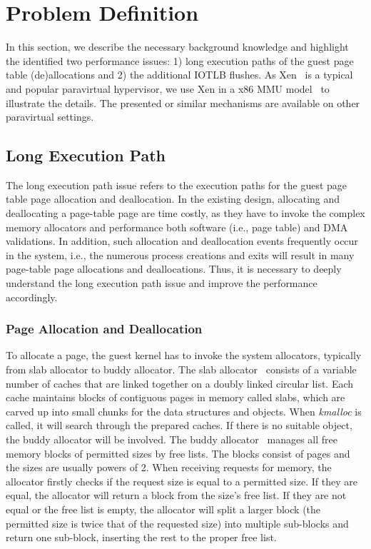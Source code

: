 \section{Problem Definition} \label{sec:prob}
In this section, we describe the necessary background knowledge and highlight the identified two performance issues: 1) long execution paths of the guest page table (de)allocations and 2) the additional IOTLB flushes.
As Xen~\cite{XEN-SOSP03} is a typical and popular paravirtual hypervisor, we use Xen in a x86 MMU model~\cite{x86-pv-model} to illustrate the details.
The presented or similar mechanisms are available on other paravirtual settings.


\subsection{Long Execution Path}\label{sec:longpath}
The long execution path issue refers to the execution paths for the guest page table page allocation and deallocation.
In the existing design, allocating and deallocating a page-table page are time costly, as they have to invoke the complex memory allocators and performance both software (i.e., page table) and DMA validations.
In addition, such allocation and deallocation events frequently occur in the system, i.e., the numerous process creations and exits will result in many page-table page allocations and deallocations.
Thus, it is necessary to deeply understand the long execution path issue and improve the performance accordingly.

\subsubsection{Page Allocation and Deallocation}
To allocate a page, the guest kernel has to invoke the system allocators, typically from slab allocator to buddy allocator.
The slab allocator~\cite{slaballocator} consists of a variable number of caches that are linked together on a doubly linked circular list.
Each cache maintains blocks of contiguous pages in memory called slabs, which are carved up into small chunks for the data structures and objects.
When \emph{kmalloc} is called, it will search through the prepared caches.
If there is no suitable object, the buddy allocator will be involved.
The buddy allocator~\cite{buddyallocator} manages all free memory blocks of permitted sizes by free lists. The blocks consist of pages and the sizes are usually powers of 2.
When receiving requests for memory, the allocator firstly checks if the request size is equal to a permitted size. If they are equal, the allocator will return a block from the size's free list. If they are not equal or the free list is empty, the allocator will split a larger block (the permitted size is twice that of the requested size) into multiple sub-blocks and return one sub-block, inserting the rest to the proper free list. 

